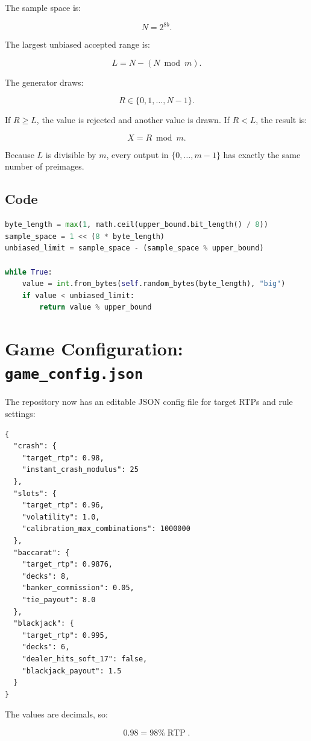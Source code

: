 \documentclass[11pt]{article}
\begin{document}
The sample space is:

\[
N = 2^{8b}.
\]

The largest unbiased accepted range is:

\[
L = N - (N \bmod m).
\]

The generator draws:

\[
R \in \{0,1,\ldots,N-1\}.
\]

If \(R \geq L\), the value is rejected and another value is drawn. If \(R < L\), the result is:

\[
X = R \bmod m.
\]

Because \(L\) is divisible by \(m\), every output in \(\{0,\ldots,m-1\}\) has exactly the same number of preimages.

\subsection{Code}

\begin{lstlisting}[language=Python]
byte_length = max(1, math.ceil(upper_bound.bit_length() / 8))
sample_space = 1 << (8 * byte_length)
unbiased_limit = sample_space - (sample_space % upper_bound)

while True:
    value = int.from_bytes(self.random_bytes(byte_length), "big")
    if value < unbiased_limit:
        return value % upper_bound
\end{lstlisting}

\section{Game Configuration: \texttt{game\_config.json}}

The repository now has an editable JSON config file for target RTPs and rule settings:

\begin{lstlisting}
{
  "crash": {
    "target_rtp": 0.98,
    "instant_crash_modulus": 25
  },
  "slots": {
    "target_rtp": 0.96,
    "volatility": 1.0,
    "calibration_max_combinations": 1000000
  },
  "baccarat": {
    "target_rtp": 0.9876,
    "decks": 8,
    "banker_commission": 0.05,
    "tie_payout": 8.0
  },
  "blackjack": {
    "target_rtp": 0.995,
    "decks": 6,
    "dealer_hits_soft_17": false,
    "blackjack_payout": 1.5
  }
}
\end{lstlisting}

The values are decimals, so:

\[
0.98 = 98\% \operatorname{RTP}.
\]
\end{document}
